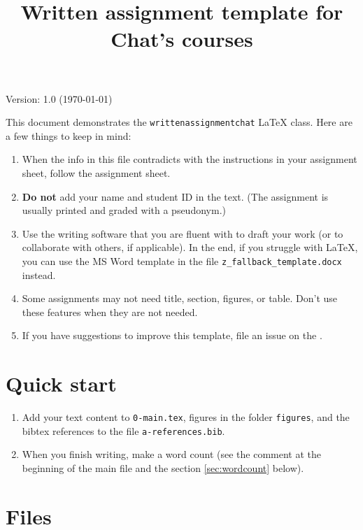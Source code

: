 \documentclass{writtenassignmentchat}
\title{Written assignment template for Chat's courses}
\begin{document}
\maketitle
\begin{flushleft}
Version: 1.0 (\today)

This document demonstrates the \texttt{writtenassignmentchat} \LaTeX{} class. Here are a few things to keep in mind:
\end{flushleft}

\begin{enumerate}
  \item When the info in this file contradicts with the instructions in your assignment sheet, follow the assignment sheet.
  \item \textbf{Do not} add your name and student ID in the text. (The assignment is usually printed and graded with a pseudonym.)
  \item Use the writing software that you are fluent with to draft your work (or to collaborate with others, if applicable). In the end, if you struggle with \LaTeX{}, you can use the MS Word template in the file \verb|z_fallback_template.docx| instead.
  \item Some assignments may not need title, section, figures, or table. Don't use these features when they are not needed.
  \item If you have suggestions to improve this template, file an issue on the  .
\end{enumerate}



\section{Quick start}

\begin{enumerate}
  \item Add your text content to \verb|0-main.tex|, figures in the folder \verb|figures|, and the bibtex references to the file \verb|a-references.bib|.
  \item When you finish writing, make a word count (see the comment at the beginning of the main file and the section \ref{sec:wordcount} below).
\end{enumerate}

\section{Files}
\end{document}

